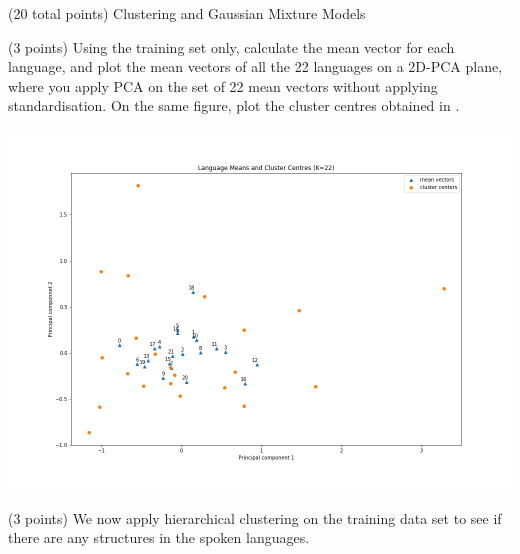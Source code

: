 \documentclass[12pt]{article}
\begin{document}
\begin{question}{(20 total points) Clustering and Gaussian Mixture Models}
\begin{subquestion}
\begin{answerbox}{35em}
      \end{answerbox}
  


   \end{subquestion}
   \begin{subquestion}{(3 points)
       Using the training set only,
       calculate the mean vector for each language, and plot the mean
       vectors of all the 22 languages on a 2D-PCA plane, where you
       apply PCA on the set of 22 mean vectors without applying
       standardisation.  
       On the same figure, plot the cluster centres obtained in .
     } \label{Q3.2}

   

      \begin{answerbox}{35em}
         \begin{center}
             \includegraphics[width=\textwidth]{results/3_2.png}
         \end{center}
      \end{answerbox}
  


   \end{subquestion}
   \begin{subquestion}{(3 points)
       We now apply hierarchical clustering on the training data set
       to see if there are any structures in the spoken languages.
     } \label{Q3.3}


     


\end{subquestion}
\end{question}
\end{document}
